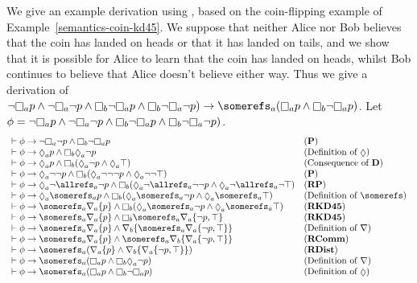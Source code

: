 \begin{example}
We give an example derivation using \axiomKDF{}, based on the coin-flipping
example of Example~\ref{semantics-coin-kd45}. We suppose that neither Alice nor
Bob believes that the coin has landed on heads or that it has landed on tails,
and we show that it is possible for Alice to learn that the coin has landed on
heads, whilst Bob continues to believe that Alice doesn't believe either way.
Thus we give a derivation of $\neg \knows_a p \land \neg \knows_a \neg p \land
\knows_b \neg \knows_a p \land \knows_b \neg \knows_a \neg p) \implies \somerefs_a
(\knows_a p \land \knows_b \neg \knows_a p)$.  Let $\phi = \neg \knows_a p \land
\neg \knows_a \neg p \land \knows_b \neg \knows_a p \land \knows_b \neg \knows_a \neg
p)$.
$$
\begin{array}{ll}
\proves \phi \implies \neg \knows_a \neg p \land \knows_b \neg \knows_a p & \text{({\bf P})}\\
\proves \phi \implies \suspects_a p \land \knows_b \suspects_a \neg p &
\text{(Definition of $\suspects$)}\\
\proves \phi \implies \suspects_a p \land \knows_b (\suspects_a \neg p \land \suspects_a
\top)&
\text{(Consequence of {\bf D})}\\
\proves \phi \implies \suspects_a \neg \neg p \land \knows_b (\suspects_a \neg \neg \neg
p \land \suspects_a \neg \neg \top)&
\text{({\bf P})}\\
\proves \phi \implies \suspects_a \neg \allrefs_a \neg p \land \knows_b (\suspects_a \neg
\allrefs_a \neg \neg p \land \suspects_a \neg \allrefs_a \neg \top)&
\text{({\bf RP})}\\
\proves \phi \implies \suspects_a \somerefs_a p \land \knows_b (\suspects_a \somerefs_a
\neg p \land \suspects_a \somerefs_a \top)&
\text{(Definition of $\somerefs$)}\\
\proves \phi \implies \somerefs_a \covers_a \{p\} \land \knows_b (\suspects_a \somerefs_a
\neg p \land \suspects_a \somerefs_a \top)&
\text{({\bf RKD45})}\\
\proves \phi \implies \somerefs_a \covers_a \{p\} \land \knows_b \somerefs_a \covers_a
\{\neg p, \top\}&
\text{({\bf RKD45})}\\
\proves \phi \implies \somerefs_a \covers_a \{p\} \land \covers_b \{ \somerefs_a \covers_a
\{\neg p, \top\} \}&
\text{(Definition of $\covers$)}\\
\proves \phi \implies \somerefs_a \covers_a \{p\} \land \somerefs_a \covers_b \{
\covers_a \{\neg p, \top\} \}&
\text{({\bf RComm})}\\
\proves \phi \implies \somerefs_a (\covers_a \{p\} \land \covers_b \{
\covers_a \{\neg p, \top\} \})&
\text{({\bf RDist})}\\
\proves \phi \implies \somerefs_a (\knows_a p \land \knows_b 
\suspects_a \neg p)&
\text{(Definition of $\covers$)}\\
\proves \phi \implies \somerefs_a (\knows_a p \land \knows_b 
\neg \knows_a p)&
\text{(Definition of $\suspects$)}\\
\end{array}
$$
\end{example}

